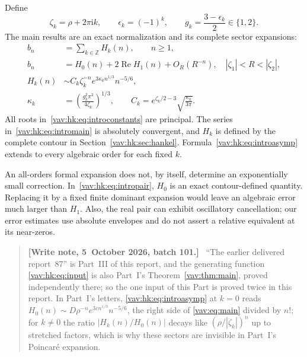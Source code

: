 \documentclass[11pt]{article}
\theoremstyle{remark}\newtheorem{remark}[theorem]{Remark}
\newcommand{\ii}{\mathrm i}
\newenvironment{writenoteb}{\begin{quote}\small\raggedright\textbf{[Write note, 5~October 2026, batch 101.]}\ }{\end{quote}}
\newcommand{\Rea}{\operatorname{Re}}
\newcommand{\Z}{\mathbb Z}
\begin{document}
Define
\begin{equation}\label{vav:hk:eq:parameters}
 \zeta_k=\rho+2\pi\ii k,\qquad
 \epsilon_k=(-1)^k,\qquad
 g_k=\frac{3-\epsilon_k}{2}\in\{1,2\}.
\end{equation}
The main results are an exact normalization and its complete sector expansions:
\begin{align}
 b_n&=\sum_{k\in\Z}H_k(n),\qquad n\geq1,\label{vav:hk:eq:intromain}\\
 b_n&=H_0(n)+2\Rea H_1(n)+O_R(R^{-n}),
 \quad |\zeta_1|<R<|\zeta_2|,\label{vav:hk:eq:intropair}\\
 H_k(n)&\sim C_k\zeta_k^{-n}e^{3\kappa_kn^{1/3}}n^{-5/6},\label{vav:hk:eq:introasymp}\\
 \kappa_k&=\left(\frac{g_k^2\pi^2}{4\zeta_k}\right)^{1/3},\qquad
 C_k=e^{\zeta_k/2-3}\sqrt{\frac{\kappa_k}{3\pi}}.\label{vav:hk:eq:introconstants}
\end{align}
All roots in~\eqref{vav:hk:eq:introconstants} are principal. The series in~\eqref{vav:hk:eq:intromain} is absolutely convergent, and $H_k$ is defined by the complete contour in Section~\ref{vav:hk:sec:hankel}. Formula~\eqref{vav:hk:eq:introasymp} extends to every algebraic order for each fixed $k$.

An all-orders formal expansion does not, by itself, determine an exponentially small correction. In~\eqref{vav:hk:eq:intropair}, $H_0$ is an exact contour-defined quantity. Replacing it by a fixed finite dominant expansion would leave an algebraic error much larger than $H_1$. Also, the real pair can exhibit oscillatory cancellation; our error estimates use absolute envelopes and do not assert a relative equivalent at its near-zeros.
\begin{writenoteb}
``The earlier delivered report~87'' is Part~III of this report, and the
generating function \eqref{vav:hk:eq:input} is also Part~I's
Theorem~\ref{vav:thm:main}, proved independently there; so the one input of
this Part is proved twice in this report. In Part~I's letters,
\eqref{vav:hk:eq:introasymp} at $k=0$ reads $H_0(n)\sim D\rho^{-n}e^{3cn^{1/3}}n^{-5/6}$,
the right side of \eqref{vav:eq:main} divided by $n!$; for $k\ne0$ the ratio
$|H_k(n)/H_0(n)|$ decays like $(\rho/|\zeta_k|)^n$ up to stretched factors,
which is why these sectors are invisible in Part~I's Poincar\'e expansion.
\end{writenoteb}
\end{document}
